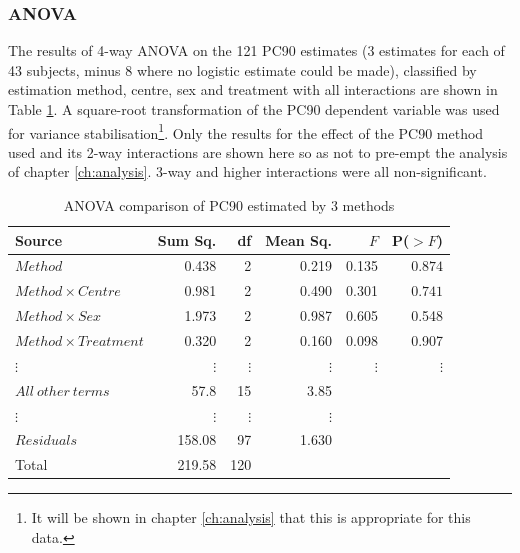 \subsubsection*{ANOVA}
The results of 4-way ANOVA on the 121 PC90 estimates (3 estimates for each of 43 subjects, minus 8 where no logistic estimate could be made), classified by estimation method, centre, sex and treatment with all interactions are shown in Table \ref{pc90aov}. A square-root transformation of the PC90 dependent variable was used for variance stabilisation\footnote{It will be shown in chapter \ref{ch:analysis} that this is appropriate for this data.}. Only the results for the effect of the PC90 method used and its 2-way interactions are shown here so as not to pre-empt the analysis of chapter \ref{ch:analysis}. 3-way and higher interactions were all non-significant.
\begin{table}[h]
\centering
\caption{ANOVA comparison of PC90 estimated by 3 methods}\label{pc90aov}
\begin{tabular}{l|rrrrr}
Source&Sum Sq.&df&Mean Sq.&$F$&P($>F$)\\
\hline
$Method$&0.438&2&0.219&0.135&$0.874$\\
$Method\times Centre$&0.981&2&0.490&0.301&$0.741$\\
$Method\times Sex$&1.973&2&0.987&0.605&0.548\\
$Method\times Treatment$&0.320&2&0.160&0.098&0.907\\
$\vdots$&$\vdots$&$\vdots$&$\vdots$&$\vdots$&$\vdots$\\
$All\ other\ terms$&57.8&15&3.85&&\\
$\vdots$&$\vdots$&$\vdots$&$\vdots$&&\\
$Residuals$&158.08&97&1.630&&\\
\hline
Total&219.58&120&&&
\end{tabular}
\end{table}

